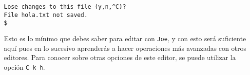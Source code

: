 \begin{verbatim}
Lose changes to this file (y,n,^C)? 
File hola.txt not saved.
$
\end{verbatim}

Esto es  lo mínimo que  debes saber para editar  con {\tt Joe},  y con
esto  será suficiente  aquí pues  en  lo sucesivo  aprenderás a  hacer
operaciones más avanzadas con otros editores. Para conocer sobre otras
opciones de este editor, se puede utilizar la opción {\tt C-k h}.



